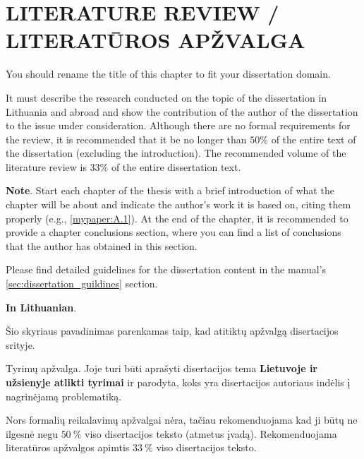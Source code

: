 
\setcounter{chapter}{0}

\chapter{\MakeUppercase{Literature review / Literatūros apžvalga}} %
\label{cha:review}


You should rename the title of this chapter to fit your dissertation domain. 

It must describe the research conducted on the topic of the dissertation in Lithuania and abroad and show the contribution of the author of the dissertation to the issue under consideration.
Although there are no formal requirements for the review, it is recommended that it be no longer than $50\%$ of the entire text of the dissertation (excluding the introduction). The recommended volume of the literature review is $33\%$ of the entire dissertation text.

\textbf{Note}. Start each chapter of the thesis with a brief introduction of what the chapter will be about and indicate the author's work it is based on, citing them properly (e.g., \ref{mypaper:A.1}). At the end of the chapter, it is recommended to provide a chapter conclusions section, where you can find a list of conclusions that the author has obtained in this section.

Please find detailed guidelines for the dissertation content in the manual's \ref{sec:dissertation_guildines} section.

\textbf{In Lithuanian}.

Šio skyriaus pavadinimas parenkamas taip, kad atitiktų apžvalgą disertacijos srityje.

Tyrimų apžvalga. Joje turi būti aprašyti disertacijos tema \textbf{Lietuvoje ir užsienyje atlikti tyrimai} ir parodyta, koks yra disertacijos autoriaus indėlis į nagrinėjamą problematiką.

Nors formalių reikalavimų apžvalgai nėra, tačiau rekomenduojama kad ji būtų ne ilgesnė negu $50\ \%$ viso disertacijos teksto (atmetus įvadą). Rekomenduojama literatūros apžvalgos apimtis $33\ \%$ viso disertacijos teksto.

